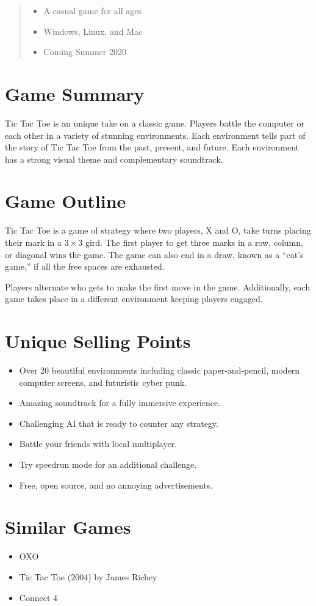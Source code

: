 \documentclass{tufte-handout}
\begin{document}
\begin{abstract}
  \begin{itemize}[noitemsep,label=]
    \item A casual game for all ages
    \item Windows, Linux, and Mac
    \item Coming Summer 2020
  \end{itemize}
\end{abstract}


\section{Game Summary}
Tic Tac Toe is an unique take on a classic game. Players battle the computer or
each other in a variety of stunning environments. Each environment tells part of
the story of Tic Tac Toe from the past, present, and future. Each environment
has a strong visual theme and complementary soundtrack.


\section{Game Outline}
Tic Tac Toe is a game of strategy where two players, X and O, take turns placing
their mark in a $3\times3$ gird. The first player to get three marks in a row,
column, or diagonal wins the game. The game can also end in a draw, known as a
``cat's game,'' if all the free spaces are exhausted.

Players alternate who gets to make the first move in the game. Additionally,
each game takes place in a different environment keeping players engaged.


\section{Unique Selling Points}
\begin{itemize}[noitemsep]
  \item {
    Over 20 beautiful environments including classic paper-and-pencil, modern
    computer screens, and futuristic cyber punk.
  }
  \item Amazing soundtrack for a fully immersive experience.
  \item Challenging AI that is ready to counter any strategy.
  \item Battle your friends with local multiplayer.
  \item Try speedrun mode for an additional challenge.
  \item Free, open source, and no annoying advertisements.
\end{itemize}


\section{Similar Games}
\begin{itemize}[noitemsep]
  \item OXO
  \item Tic Tac Toe (2004) by James Richey
  \item Connect 4
\end{itemize}
\end{document}

